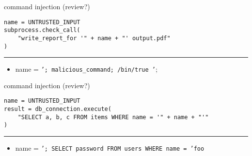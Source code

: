 \begin{frame}[fragile]{command injection (review?)}
\begin{Verbatim}[fontsize=\small]
name = UNTRUSTED_INPUT
subprocess.check_call(
    "write_report_for '" + name + "' output.pdf"
)
\end{Verbatim}
\hrule
\begin{itemize}
\item name = \texttt{'; malicious\_command; /bin/true '};
\end{itemize}
\end{frame}

\begin{frame}[fragile]{command injection (review?)}
\begin{Verbatim}[fontsize=\small]
name = UNTRUSTED_INPUT
result = db_connection.execute(
    "SELECT a, b, c FROM items WHERE name = '" + name + "'"
)
\end{Verbatim}
\hrule
\begin{itemize}
\item name = \texttt{'; SELECT password FROM users WHERE name = 'foo}
\end{itemize}
\end{frame}


